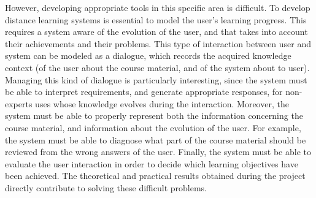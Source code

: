 However, developing appropriate tools in this specific area is difficult.
To develop distance learning systems is essential to model the user's learning
progress. This requires a system aware of the evolution of the
user, and that takes into account their achievements and their problems. This type
of interaction between user and system can be modeled as a dialogue, which
records the acquired knowledge context (of the user about the course material, and
of the system about to user). Managing this kind of dialogue is particularly interesting,
since the system must be able to interpret requirements, and generate
appropriate responses, for non-experts uses whose knowledge evolves during the
interaction. Moreover, the system must be able to properly represent both the
information concerning the course material, and information about the
evolution of the user. For example, the system must be able to diagnose what
part of the course material should be reviewed from the wrong answers of the
user. Finally, the system must be able to evaluate the user interaction in order
to decide which learning objectives have been achieved. The theoretical and practical
results obtained during the project directly contribute to solving these difficult
problems.




